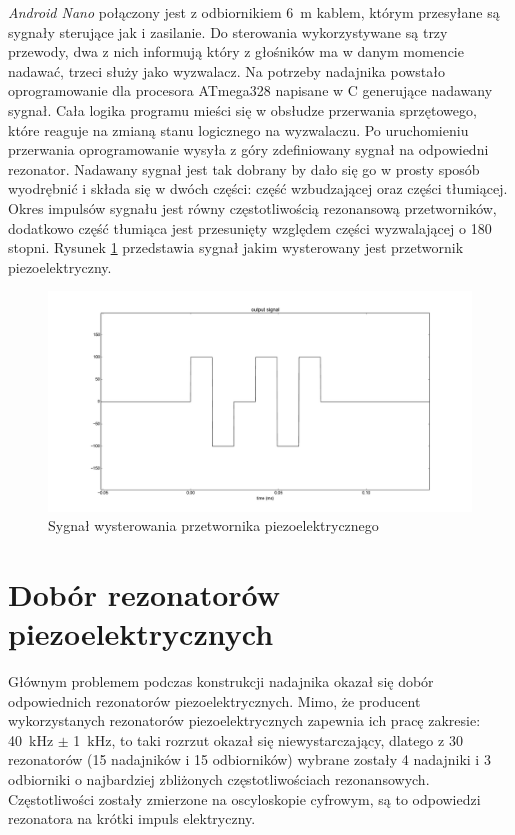 

\textit{Android Nano} połączony jest z odbiornikiem \SI{6}{m} kablem, którym przesyłane są sygnały sterujące jak i zasilanie.
Do sterowania wykorzystywane są trzy przewody, dwa z nich informują który z głośników ma w danym momencie nadawać,
trzeci służy jako wyzwalacz. 
Na potrzeby nadajnika powstało oprogramowanie dla procesora ATmega328 napisane w C generujące nadawany sygnał.
Cała logika programu mieści się w obsłudze przerwania sprzętowego, które reaguje na zmianą stanu logicznego
na wyzwalaczu.
Po uruchomieniu przerwania oprogramowanie wysyła z góry zdefiniowany sygnał na odpowiedni rezonator. 
Nadawany sygnał jest tak dobrany by dało się go w prosty sposób wyodrębnić i składa się w dwóch
części: część wzbudzającej oraz części tłumiącej.
Okres impulsów sygnału jest równy częstotliwością rezonansową przetworników, dodatkowo część tłumiąca
jest przesunięty względem części wyzwalającej o 180 stopni.  
Rysunek \ref{fig:output_signal} przedstawia sygnał jakim wysterowany jest przetwornik piezoelektryczny. 


\begin{figure}[h!]
    \centering
    \includegraphics[width=1.15\textwidth, trim= 47mm 0mm 0mm 0mm,clip]{output_signal}
    \caption{Sygnał wysterowania przetwornika piezoelektrycznego}
    \label{fig:output_signal}
\end{figure}

\newpage

\section{Dobór rezonatorów piezoelektrycznych}

Głównym problemem podczas konstrukcji nadajnika okazał się dobór odpowiednich rezonatorów piezoelektrycznych.
Mimo, że producent wykorzystanych rezonatorów piezoelektrycznych zapewnia ich pracę zakresie: \SI{40}{kHz} $\pm$ \SI{1}{kHz}, to taki rozrzut okazał się niewystarczający, 
dlatego z 30 rezonatorów (15 nadajników i 15 odbiorników) wybrane zostały 4 nadajniki i 3 odbiorniki o najbardziej 
zbliżonych częstotliwościach rezonansowych. Częstotliwości zostały zmierzone na oscyloskopie cyfrowym, są to odpowiedzi 
rezonatora na krótki impuls elektryczny.

